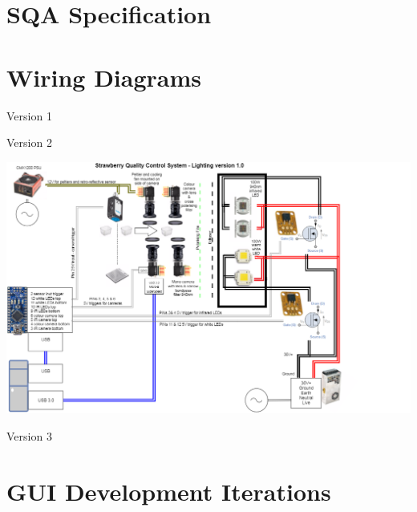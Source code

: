 \documentclass[fleqn,twoside,12pt]{report}
\begin{document}
\newpage
\appendix
\chapter{SQA Specification}
\label{app:sqa_specs}

\newpage


\begin{minipage}[b]{0.9\linewidth}
	
\end{minipage}




\newpage

\chapter{Wiring Diagrams}
\label{app:wiring}

\newpage

Version 1
\begin{minipage}[b]{0.9\linewidth}
	
\end{minipage}



\newpage
Version 2
\begin{minipage}[b]{0.9\linewidth}
	\includegraphics[scale=0.9,angle=270]{appendix/wiring_2.png}
\end{minipage}




\newpage
Version 3
\begin{minipage}[b]{0.9\linewidth}
	
\end{minipage}



\newpage

\chapter{GUI Development Iterations}
\label{app:gui}

\newpage

\begin{minipage}[b]{0.9\linewidth}
	
\end{minipage}






\end{document}

